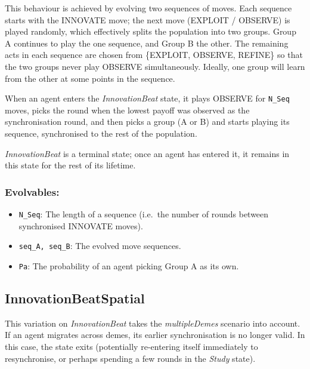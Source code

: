 \documentclass[a4paper,10pt]{article}
\begin{document}
This behaviour is achieved by evolving two sequences of moves. Each sequence starts with the INNOVATE
move; the next move (EXPLOIT / OBSERVE) is played randomly, which effectively splits the population into
two groups. Group A continues to play the one sequence, and Group B the other. The remaining acts in
each sequence are chosen from \{EXPLOIT, OBSERVE, REFINE\} so that the two groups never play OBSERVE
simultaneously. Ideally, one group will learn from the other at some points in the sequence.

When an agent enters the \emph{InnovationBeat} state, it plays OBSERVE for \texttt{N\_Seq} moves, picks
the round when the lowest payoff was observed as the synchronisation round, and then picks a group (A or B)
and starts playing its sequence, synchronised to the rest of the population.

\emph{InnovationBeat} is a terminal state; once an agent has entered it, it remains in this state for the
rest of its lifetime.

\subsubsection*{Evolvables:}
\begin{itemize}
 \item \texttt{N\_Seq}: The length of a sequence (i.e.\ the number of rounds between synchronised
    INNOVATE moves).
 \item \texttt{seq\_A, seq\_B}: The evolved move sequences.
 \item \texttt{Pa}: The probability of an agent picking Group A as its own.
\end{itemize}

\subsection{InnovationBeatSpatial}
This variation on \emph{InnovationBeat} takes the \emph{multipleDemes} scenario into account. If an agent
migrates across demes, its earlier synchronisation is no longer valid. In this case, the state exits (potentially
re-entering itself immediately to resynchronise, or perhaps spending a few rounds in the \emph{Study} state).
\end{document}
